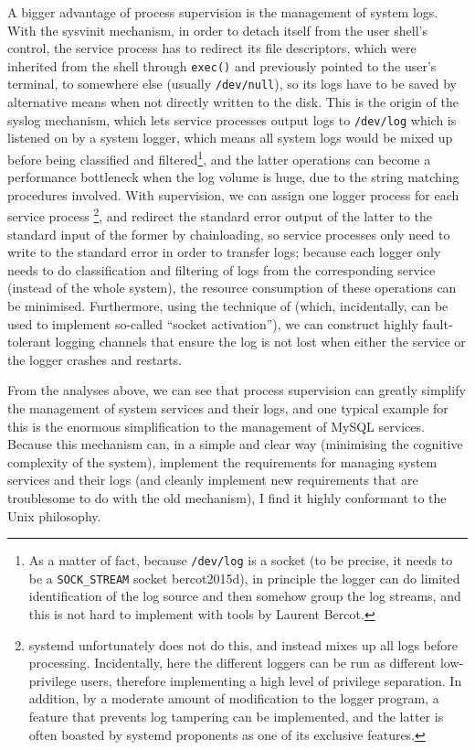 A bigger advantage of process supervision is the management of system logs.
With the sysvinit mechanism, in order to detach itself from the user shell's
control, the service process has to redirect its file descriptors, which were
inherited from the shell through \verb|exec()| and previously pointed to the
user's terminal, to somewhere else (usually \verb|/dev/null|), so its logs have
to be saved by alternative means when not directly written to the disk.  This
is the origin of the syslog mechanism, which lets service processes output logs
to \verb|/dev/log| which is listened on by a system logger, which means all
system logs would be mixed up before being classified and filtered\footnote%
{\label{fn:logtype}As a matter of fact, because \texttt{/dev/log} is a socket
(to be precise, it needs to be a \texttt{SOCK\_STREAM} socket\cupercite%
{bercot2015d}), in principle the logger can do limited identification of the
log source and then somehow group the log streams, and this is not hard to
implement with tools by Laurent Bercot.},
and the latter operations can become a performance bottleneck when the log
volume is huge, due to the string matching procedures involved.  With
supervision, we can assign one logger process for each service process%
\footnote{systemd unfortunately does not do this, and
instead mixes up all logs before processing.  Incidentally, here the different
loggers can be run as different low-privilege users, therefore implementing
a high level of privilege separation.  In addition, by a moderate amount of
modification to the logger program, a feature that prevents log tampering%
 can be implemented, and the latter is often boasted by
systemd proponents as one of its exclusive features.}, and redirect the standard
error output of the latter to the standard input of the former by chainloading,
so service processes only need to write to the standard error in order to
transfer logs; because each logger only needs to do classification and filtering
of logs from the corresponding service (instead of the whole system), the
resource consumption of these operations can be minimised.  Furthermore, using
the technique of  (which, incidentally,
can be used to implement so-called ``socket activation''), we can construct
highly fault-tolerant logging channels that ensure the log is not lost
when either the service or the logger crashes and restarts.

From the analyses above, we can see that process supervision can greatly
simplify the management of system services and their logs, and one typical
example for this is the enormous simplification to the management of MySQL
services.  Because this mechanism can, in a simple
and clear way (minimising the cognitive complexity of the system), implement
the requirements for managing system services and their logs (and cleanly
implement new requirements that are troublesome to do with the old
mechanism), I find it highly conformant to the Unix philosophy.

